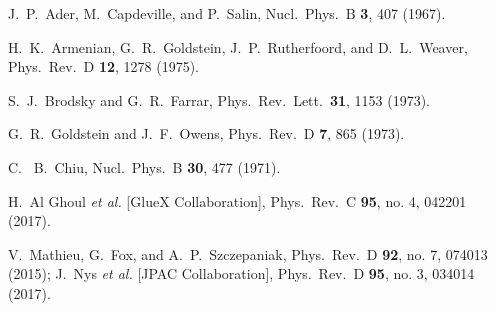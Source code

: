 \documentclass[aps,prc,twocolumn,floatfix,showpacs,preprintnumbers,amsmath,amssymb,superscriptaddress,linenumbers]{revtex4-1}
\begin{document}
\begin{thebibliography}{99}

  J.~P.~Ader, M.~Capdeville, and P.~Salin,
  Nucl.\ Phys.\ B {\bf 3}, 407 (1967).

  H.~K.~Armenian, G.~R.~Goldstein, J.~P.~Rutherfoord, and D.~L.~Weaver,
  Phys.\ Rev.\ D {\bf 12}, 1278 (1975).

  S.~J.~Brodsky and G.~R.~Farrar,
  Phys.\ Rev.\ Lett.\  {\bf 31}, 1153 (1973).

  G.~R.~Goldstein and J.~F.~Owens,
  Phys.\ Rev.\ D {\bf 7}, 865 (1973).

	C.~ B.~Chiu,
	Nucl.\ Phys.\ B {\bf 30}, 477 (1971).
	
  H.~Al Ghoul {\it et al.} [GlueX Collaboration],
  Phys.\ Rev.\ C {\bf 95}, no. 4, 042201 (2017).

  V.~Mathieu, G.~Fox, and A.~P.~Szczepaniak,
  Phys.\ Rev.\ D {\bf 92}, no. 7, 074013 (2015);
  J.~Nys {\it et al.} [JPAC Collaboration],
  Phys.\ Rev.\ D {\bf 95}, no. 3, 034014 (2017).


\end{thebibliography}
\end{document}
